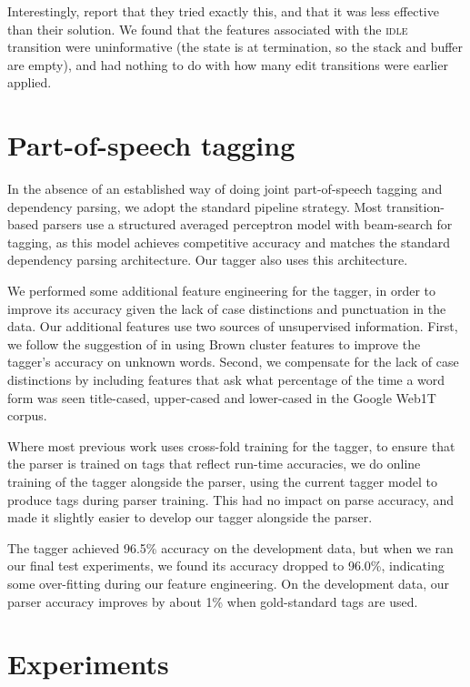 \documentclass[11pt,letterpaper]{article}
\begin{document}
Interestingly, \citet{zhang:13} report that they tried exactly this, and that it
was less effective than their solution. We found that the features
associated with the \textsc{idle} transition were uninformative (the state is at
termination, so the stack and buffer are empty), and had nothing to do with how
many edit transitions were earlier applied.

\section{Part-of-speech tagging}

In the absence of an established way of doing joint part-of-speech tagging and
dependency parsing, we adopt the standard pipeline strategy.  Most transition-based
parsers use a structured averaged perceptron model with beam-search for tagging,
as this model achieves competitive accuracy and matches the standard dependency
parsing architecture. Our tagger also uses this architecture.

We performed some additional feature engineering for the tagger, in order to
improve its accuracy given the lack of case distinctions and punctuation in
the data. Our additional features use two sources of unsupervised information.
First, we follow the suggestion of \citet{manning:11} in using Brown cluster
features to improve the tagger's accuracy on unknown words. Second, we compensate
for the lack of case distinctions by including features that ask what percentage
of the time a word form was seen title-cased, upper-cased and lower-cased in the
Google Web1T corpus. 

Where most previous work uses cross-fold training for the tagger, to ensure that the
parser is trained on tags that reflect run-time accuracies, we do online training
of the tagger alongside the parser, using the current tagger model to produce
tags during parser training.  This had no impact on parse accuracy, and made it
slightly easier to develop our tagger alongside the parser.

The tagger achieved 96.5\% accuracy on the development data, but when we ran our
final test experiments, we found its accuracy dropped to 96.0\%, indicating
some over-fitting during our feature engineering.  On the development data,
our parser accuracy improves by about 1\% when gold-standard tags are used.

\section{Experiments}
\end{document}
